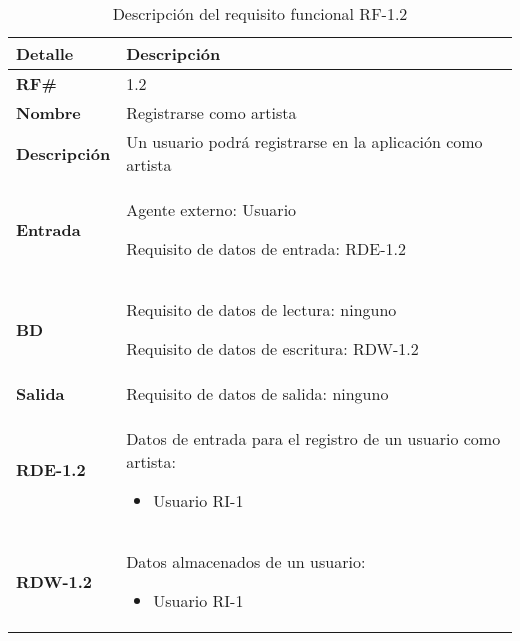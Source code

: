 \begin{table}[H]
    \centering
    \begin{tabular}{|p{3cm}|p{8cm}|}
        \hline
        \rowcolor{lightgray}
        \textbf{Detalle} & \textbf{Descripción} \\
        \hline
        \textbf{RF\#} & 1.2 \\
        \hline
        \textbf{Nombre} & Registrarse como artista \\
        \hline
        \textbf{Descripción} & Un usuario podrá registrarse en la aplicación como artista \\
        \hline
        \textbf{Entrada} &
        Agente externo: Usuario
        
        Requisito de datos de entrada: RDE-1.2 \\
        \hline
        \textbf{BD} &
        Requisito de datos de lectura: ninguno
        
        Requisito de datos de escritura: RDW-1.2 \\
        \hline
        \textbf{Salida} & Requisito de datos de salida: ninguno \\
        \hline
        \textbf{RDE-1.2} & Datos de entrada para el registro de un usuario como artista:
            \begin{itemize}
                \item Usuario RI-1
            \end{itemize} \\
        \hline
        \textbf{RDW-1.2} & Datos almacenados de un usuario:
            \begin{itemize}
                \item Usuario RI-1
            \end{itemize} \\
        \hline
    \end{tabular}
    \caption{Descripción del requisito funcional RF-1.2}
    \label{tab:rf-1-2}
\end{table}

